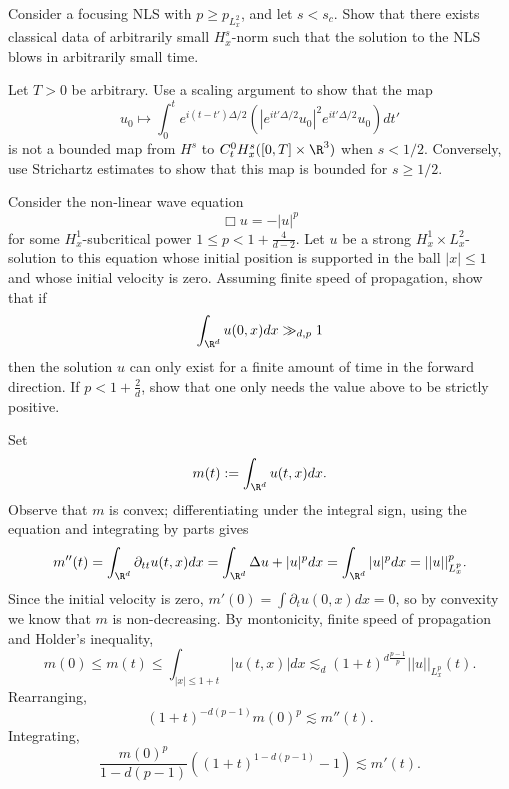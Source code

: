 \begin{statement}
	Consider a focusing NLS with $p \geq p_{L^2_x}$, and let $s < s_c$. Show that there exists classical data of arbitrarily small $H^s_x$-norm such that the solution to the NLS blows in arbitrarily small time. 
\end{statement}

\begin{solution}

\end{solution}

\begin{statement}
	Let $T > 0$ be arbitrary. Use a scaling argument to show that the map 
		\[ u_0 \mapsto \int_0^t e^{i (t - t') \Delta/2} (|e^{i t' \Delta/2} u_0|^2 e^{it' \Delta/2} u_0) dt' \]
	is not a bounded map from $H^s$ to $C^0_t H^s_x ([0, T] \times \R^3)$ when $s < 1/2$. Conversely, use Strichartz estimates to show that this map is bounded for $s \geq 1/2$. 	
\end{statement}

\begin{solution}

\end{solution}

\begin{statement}
	Consider the non-linear wave equation
		\[ \Box u = - |u|^p \]
	for some $H^1_x$-subcritical power $1 \leq p < 1 + \frac{4}{d - 2}$. Let $u$ be a strong $H^1_x \times L^2_x$-solution to this equation whose initial position is supported in the ball $|x| \leq 1$ and whose initial velocity is zero. Assuming finite speed of propagation, show that if 
		\[ \int_{\R^d} u(0, x) dx \gg_{d, p} 1 \]
	then the solution $u$ can only exist for a finite amount of time in the forward direction. If $p < 1 + \frac{2}{d}$, show that one only needs the value above to be strictly positive. 	
\end{statement}

\begin{solution}
	Set
		\[ m(t) := \int_{\R^d} u(t, x) dx. \]
	Observe that $m$ is convex; differentiating under the integral sign, using the equation and integrating by parts gives
		\[ m'' (t) = \int_{\R^d} \partial_{tt} u(t, x) dx = \int_{\R^d} \Delta u + |u|^p dx = \int_{\R^d} |u|^p dx = ||u||_{L^p_x}^p. \]
	Since the initial velocity is zero, $m'(0) = \int \partial_t u(0, x) dx = 0$, so by convexity we know that $m$ is non-decreasing. By montonicity, finite speed of propagation and Holder's inequality,	
		\[ m(0) \leq m(t) \leq \int_{|x| \leq 1 + t} |u(t, x)| dx \lesssim_d (1 + t)^{d \frac{p - 1}{p}} ||u||_{L^p_x} (t).\]
	Rearranging,
		\[ (1 + t)^{-d(p - 1)} m(0)^p \lesssim m''(t). \]		
	Integrating, 
		\[ \frac{m(0)^p}{1 - d(p - 1)} ( (1 + t)^{1 -d(p - 1)} - 1) \lesssim m' (t).  \]		
\end{solution}

